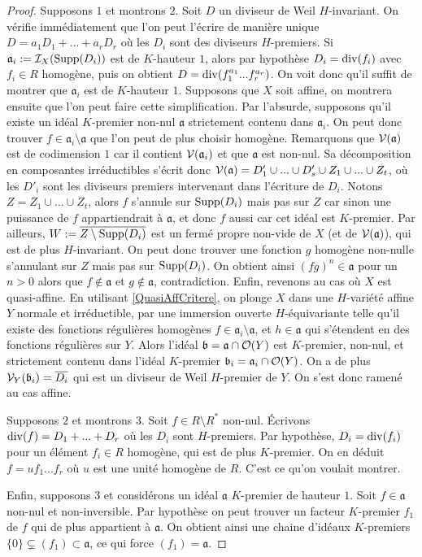 \begin{proof}
Supposons $1$ et montrons $2$. Soit $D$ un diviseur de Weil $H$-invariant. On vérifie immédiatement que l'on peut l'écrire de manière unique $D=a_1D_1+...+a_rD_r$ où les $D_i$ sont des diviseurs $H$-premiers. Si $\mathfrak{a}_i:=\mathcal{I}_X(\operatorname{Supp}(D_i))$ est de $K$-hauteur $1$, alors par hypothèse $D_i=\operatorname{div}(f_i)$ avec $f_i\in R$ homogène, puis on obtient $D=\operatorname{div}(f_1^{a_1}...f_r^{a_r})$. On voit donc qu'il suffit de montrer que $\mathfrak{a}_i$ est de $K$-hauteur $1$. Supposons que $X$ soit affine, on montrera ensuite que l'on peut faire cette simplification. Par l'absurde, supposons qu'il existe un idéal $K$-premier non-nul $\mathfrak{a}$ strictement contenu dans $\mathfrak{a}_i$. On peut donc trouver $f\in \mathfrak{a}_i\setminus\mathfrak{a}$	 que l'on peut de plus choisir homogène. Remarquons que $\mathcal{V}(\mathfrak{a})$ est de codimension $1$ car il contient $\mathcal{V}(\mathfrak{a}_i)$ et que $\mathfrak{a}$ est non-nul. Sa décomposition en composantes irréductibles s'écrit donc $\mathcal{V}(\mathfrak{a})=D'_1\cup...\cup D'_s\cup Z_1\cup ...\cup Z_t$, où les $D'_i$ sont les diviseurs premiers intervenant dans l'écriture de $D_i$. Notons $Z=Z_1\cup ...\cup Z_t$, alors $f$ s'annule sur $\operatorname{Supp}(D_i)$ mais pas sur $Z$ car sinon une puissance de $f$ appartiendrait à $\mathfrak{a}$, et donc $f$ aussi car cet idéal est $K$-premier. Par ailleurs, $W:=\overline{Z\setminus \operatorname{Supp}(D_i)}$ est un fermé propre non-vide de $X$ (et de $\mathcal{V}(\mathfrak{a})$), qui est de plus $H$-invariant. On peut donc trouver une fonction $g$ homogène non-nulle s'annulant sur $Z$ mais pas sur $\operatorname{Supp}(D_i)$. On obtient ainsi $(fg)^n\in\mathfrak{a}$ pour un $n>0$ alors que $f\notin \mathfrak{a}$ et $g\notin\mathfrak{a}$, contradiction. Enfin, revenons au cas où $X$ est quasi-affine. En utilisant \ref{QuasiAffCritere}, on plonge $X$ dans une $H$-variété affine $Y$ normale et irréductible, par une immersion ouverte $H$-équivariante telle qu'il existe des fonctions régulières homogènes $f\in\mathfrak{a}_i\setminus \mathfrak{a}$, et $h\in\mathfrak{a}$ qui s'étendent en des fonctions régulières sur $Y$. Alors l'idéal $\mathfrak{b}=\mathfrak{a}\cap \mathcal{O}(Y)$ est $K$-premier, non-nul, et strictement contenu dans l'idéal $K$-premier $\mathfrak{b}_i=\mathfrak{a}_i\cap \mathcal{O}(Y)$. On a de plus $\mathcal{V}_Y(\mathfrak{b}_i)=\overline{D_i}$ qui est un diviseur de Weil $H$-premier de $Y$. On s'est donc ramené au cas affine.

Supposons $2$ et montrons $3$. Soit $f\in R\setminus R^*$ non-nul. Écrivons $\operatorname{div}(f)=D_1+...+D_r$ où les $D_i$ sont $H$-premiers. Par hypothèse, $D_i=\operatorname{div}(f_i)$ pour un élément $f_i\in R$ homogène, qui est de plus $K$-premier. On en déduit $f=uf_1...f_r$ où $u$ est une unité homogène de $R$. C'est ce qu'on voulait montrer.

Enfin, supposons $3$ et considérons un idéal $\mathfrak{a}$ $K$-premier de hauteur $1$. Soit $f\in\mathfrak{a}$ non-nul et non-inversible. Par hypothèse on peut trouver un facteur $K$-premier $f_1$ de $f$ qui de plus appartient à $\mathfrak{a}$. On obtient ainsi une chaine d'idéaux $K$-premiers $\lbrace 0\rbrace\varsubsetneq (f_1)\subset \mathfrak{a}$, ce qui force $(f_1)=\mathfrak{a}$.
\end{proof}


